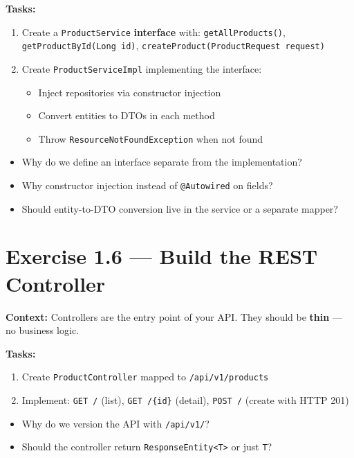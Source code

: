 \documentclass[12pt,a4paper]{report}
\begin{document}
\textbf{Tasks:}
\begin{enumerate}
    \item Create a \texttt{ProductService} \textbf{interface} with: \texttt{getAllProducts()}, \texttt{getProductById(Long id)}, \texttt{createProduct(ProductRequest request)}
    \item Create \texttt{ProductServiceImpl} implementing the interface:
    \begin{itemize}
        \item Inject repositories via constructor injection
        \item Convert entities to DTOs in each method
        \item Throw \texttt{ResourceNotFoundException} when not found
    \end{itemize}
\end{enumerate}

\begin{thinkbox}
\begin{itemize}
    \item Why do we define an interface separate from the implementation?
    \item Why constructor injection instead of \texttt{@Autowired} on fields?
    \item Should entity-to-DTO conversion live in the service or a separate mapper?
\end{itemize}
\end{thinkbox}

\section{Exercise 1.6 --- Build the REST Controller}

\textbf{Context:} Controllers are the entry point of your API. They should be \textbf{thin} --- no business logic.

\textbf{Tasks:}
\begin{enumerate}
    \item Create \texttt{ProductController} mapped to \texttt{/api/v1/products}
    \item Implement: \texttt{GET /} (list), \texttt{GET /\{id\}} (detail), \texttt{POST /} (create with HTTP 201)
\end{enumerate}

\begin{thinkbox}
\begin{itemize}
    \item Why do we version the API with \texttt{/api/v1/}?
    \item Should the controller return \texttt{ResponseEntity<T>} or just \texttt{T}?
\end{itemize}
\end{thinkbox}
\end{document}
